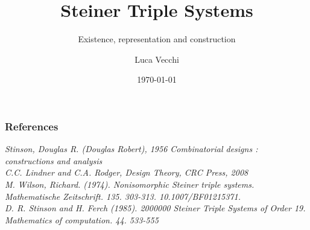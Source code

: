 \documentclass{beamer}
\title{Steiner Triple Systems}
\subtitle{Existence, representation and construction}
\author{Luca Vecchi}
\institute{University of Milan}
\date{\today}
\begin{document}
	\begin{frame}
	\titlepage
	\end{frame}
	
	
	
	
	
	
	
	
	
	
	


	\begin{frame}
	\frametitle{References}
	
	\textit{Stinson, Douglas R. (Douglas Robert), 1956 	Combinatorial designs : constructions and analysis}\\
	\textit{C.C. Lindner and C.A. Rodger, Design Theory, CRC Press, 2008}\\
	\textit{M. Wilson, Richard. (1974). Nonisomorphic Steiner triple systems. Mathematische Zeitschrift. 135. 303-313. 10.1007/BF01215371. }\\
	\textit{D. R. Stinson and H. Ferch (1985). 2000000 Steiner Triple Systems of Order 19. Mathematics of computation. 44. 533-555}
	\end{frame}
\end{document}
